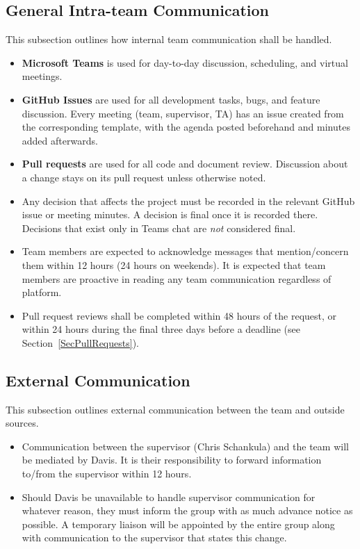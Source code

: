 \documentclass{article}
\begin{document}
\subsection{General Intra-team Communication}
This subsection outlines how internal team communication shall be handled. \newline
\begin{itemize}
  \item \textbf{Microsoft Teams} is used for day-to-day discussion, scheduling, and
    virtual meetings.
  \item \textbf{GitHub Issues} are used for all development tasks, bugs, and
    feature discussion. Every meeting (team, supervisor, TA) has an issue
    created from the corresponding template, with the agenda posted beforehand
    and minutes added afterwards.
  \item \textbf{Pull requests} are used for all code and document review. Discussion about a change stays on its pull request unless otherwise noted.
  \item Any decision that affects the project must be recorded in the
    relevant GitHub issue or meeting minutes. A decision is final once it is recorded there. Decisions that exist only in
    Teams chat are \emph{not} considered final.
  \item Team members are expected to acknowledge messages that mention/concern them within
    12 hours (24 hours on weekends). It is expected that team members are proactive in reading any team communication regardless of platform.
  \item Pull request reviews shall be completed within 48 hours of the request, or within 24 hours during the final three days before a deadline (see Section~\ref{SecPullRequests}).
\end{itemize}

\subsection{External Communication}
This subsection outlines external communication between the team and outside sources. \newline
\begin{itemize}
    \item Communication between the supervisor (Chris Schankula) and the team will be mediated by Davis. It is their responsibility to forward information to/from the supervisor within 12 hours.
    \item Should Davis be unavailable to handle supervisor communication for whatever reason, they must inform the group with as much advance notice as possible. A temporary liaison will be appointed by the entire group along with communication to the supervisor that states this change.
\end{itemize}
\end{document}

